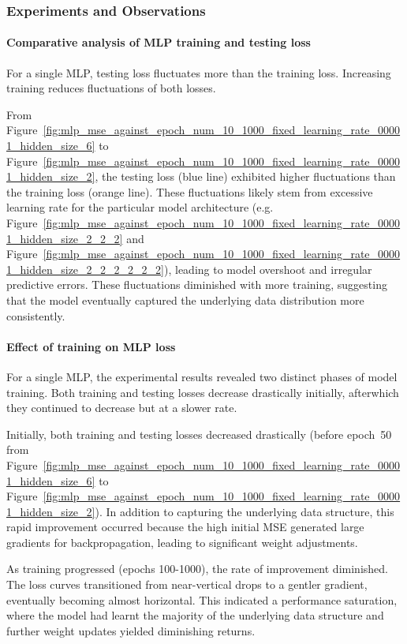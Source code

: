 \subsubsection{Experiments and Observations}
\label{subsubsec:evaluation_baseline_observations}
\paragraph{Comparative analysis of MLP training and testing loss}
For a single MLP, testing loss fluctuates more than the training loss. Increasing training reduces fluctuations of both losses. 

From Figure~\ref{fig:mlp_mse_against_epoch_num_10_1000_fixed_learning_rate_00001_hidden_size_6} to Figure~\ref{fig:mlp_mse_against_epoch_num_10_1000_fixed_learning_rate_00001_hidden_size_2}, the testing loss (blue line) exhibited higher fluctuations than the training loss (orange line). These fluctuations likely stem from excessive learning rate for the particular model architecture (e.g. Figure~\ref{fig:mlp_mse_against_epoch_num_10_1000_fixed_learning_rate_00001_hidden_size_2_2_2} and Figure~\ref{fig:mlp_mse_against_epoch_num_10_1000_fixed_learning_rate_00001_hidden_size_2_2_2_2_2_2}), leading to model overshoot and irregular predictive errors. These fluctuations diminished with more training, suggesting that the model eventually captured the underlying data distribution more consistently. 

\paragraph{Effect of training on MLP loss}
For a single MLP, the experimental results revealed two distinct phases of model training. Both training and testing losses decrease drastically initially, afterwhich they continued to decrease but at a slower rate. 

Initially, both training and testing losses decreased drastically (before epoch~50 from Figure~\ref{fig:mlp_mse_against_epoch_num_10_1000_fixed_learning_rate_00001_hidden_size_6} to Figure~\ref{fig:mlp_mse_against_epoch_num_10_1000_fixed_learning_rate_00001_hidden_size_2}). In addition to capturing the underlying data structure, this rapid improvement occurred because the high initial MSE generated large gradients for backpropagation, leading to significant weight adjustments. 

As training progressed (epochs 100-1000), the rate of improvement diminished. The loss curves transitioned from near-vertical drops to a gentler gradient, eventually becoming almost horizontal. This indicated a performance saturation, where the model had learnt the majority of the underlying data structure and further weight updates yielded diminishing returns. 


